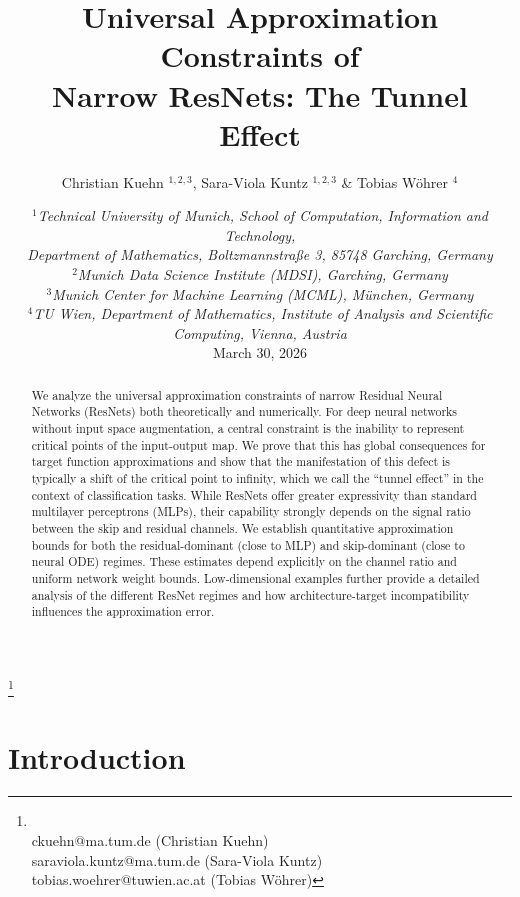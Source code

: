 \documentclass[10pt]{article}
\title{\textbf{Universal Approximation Constraints of \\ Narrow ResNets: The Tunnel Effect}}
\author{Christian Kuehn \orcidlink{0000-0002-7063-6173}$^{1,2,3}$,
 Sara-Viola Kuntz \orcidlink{0009-0000-4611-9742}$^{1,2,3}$
\& Tobias Wöhrer \orcidlink{0000-0001-6993-7385}$^4$
}
\date{
	\small{$^1$\textit{Technical University of Munich, School of Computation, Information and Technology, \\ Department of Mathematics, Boltzmannstraße 3, 85748 Garching, Germany} \\
	$^2$\textit{Munich Data Science Institute (MDSI), Garching, Germany } \\
	$^3$\textit{Munich Center for Machine Learning (MCML), München, Germany }\\
    $^4$\textit{TU Wien, Department of Mathematics, Institute of Analysis and Scientific Computing, Vienna, Austria}}\\[7mm]
	\large{March 30, 2026}
}
\theoremstyle{definition}
\numberwithin{equation}{section}
\newcommand\blfootnote[1]{%
	\begingroup
	\renewcommand\thefootnote{}\footnote{#1}%
	\addtocounter{footnote}{-1}%
	\endgroup
}
\begin{document}
	\maketitle
	
\begin{abstract}
We analyze the universal approximation constraints of narrow Residual Neural Networks (ResNets) both theoretically and numerically. For deep neural networks without input space augmentation, a central constraint is the inability to represent critical points of the input-output map. We prove that this has global consequences for target function approximations and show that the manifestation of this defect is typically a shift of the critical point to infinity, which we call the  ``tunnel effect'' in the context of classification tasks. While ResNets offer greater expressivity than standard multilayer perceptrons (MLPs), their capability strongly depends on the signal ratio between the skip and residual channels. We establish quantitative approximation bounds for both the residual-dominant (close to MLP) and skip-dominant (close to neural ODE) regimes. These estimates depend explicitly on the channel ratio and uniform network weight bounds. Low-dimensional examples further provide a detailed analysis of the different ResNet regimes and how architecture-target incompatibility influences the approximation error.
	\end{abstract}
	
	\vspace{2mm}
	
	
	\vspace{1mm}
	
	\vspace{3mm}
    
	\blfootnote{\textcolor{white}{.}\\[-2.5mm]
	\hspace{-5.4mm}\Letter \; ckuehn@ma.tum.de (Christian Kuehn)  \\[0.8mm]
	\Letter\; saraviola.kuntz@ma.tum.de (Sara-Viola Kuntz) \\[0.8mm]
	\Letter\; tobias.woehrer@tuwien.ac.at (Tobias Wöhrer) 
	}

\newpage
	{\hypersetup{linkcolor=black}
    \tableofcontents}
	
\newpage 
    \section{Introduction}\label{sec:introduction}
\end{document}
